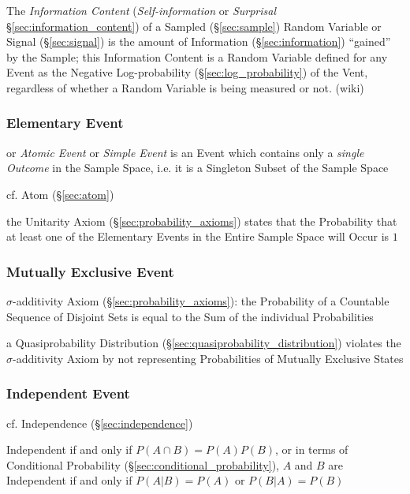 The \emph{Information Content} (\emph{Self-information} or \emph{Surprisal}
\S\ref{sec:information_content}) of a Sampled (\S\ref{sec:sample}) Random
Variable or Signal (\S\ref{sec:signal}) is the amount of Information
(\S\ref{sec:information}) ``gained'' by the Sample; this Information Content is
a Random Variable defined for any Event as the Negative Log-probability
(\S\ref{sec:log_probability}) of the Vent, regardless of whether a Random
Variable is being measured or not. (wiki)



\subsubsection{Elementary Event}\label{sec:elementary_event}

or \emph{Atomic Event} or \emph{Simple Event} is an Event which contains only a
\emph{single Outcome} in the Sample Space, i.e. it is a Singleton Subset of the
Sample Space

cf. Atom (\S\ref{sec:atom})

the Unitarity Axiom (\S\ref{sec:probability_axioms}) states that the
Probability that at least one of the Elementary Events in the Entire Sample
Space will Occur is $1$



\subsubsection{Mutually Exclusive Event}\label{sec:mutually_exclusive}

$\sigma$-additivity Axiom (\S\ref{sec:probability_axioms}): the Probability of
a Countable Sequence of Disjoint Sets is equal to the Sum of the individual
Probabilities

a Quasiprobability Distribution (\S\ref{sec:quasiprobability_distribution})
violates the $\sigma$-additivity Axiom by not representing Probabilities of
Mutually Exclusive States



\subsubsection{Independent Event}\label{sec:independent_event}

\fist cf. Independence (\S\ref{sec:independence})

Independent if and only if $P(A \cap B) = P(A) P(B)$, or in terms of Conditional
Probability (\S\ref{sec:conditional_probability}), $A$ and $B$ are Independent
if and only if $P(A|B) = P(A)$ or $P(B|A) = P(B)$

